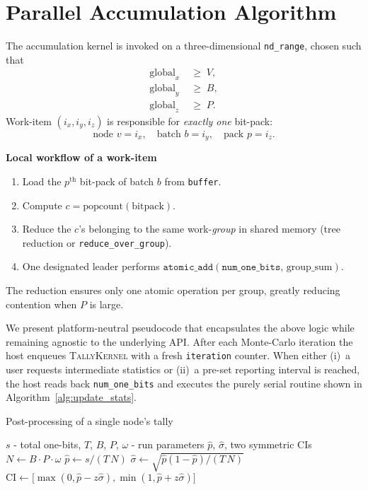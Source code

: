 \section{Parallel Accumulation Algorithm}

The accumulation kernel is invoked on a three-dimensional
\texttt{nd\_range}, chosen such that
\[
  \begin{aligned}
    \text{global}_x &\;\ge\; V,\\
    \text{global}_y &\;\ge\; B,\\
    \text{global}_z &\;\ge\; P.
  \end{aligned}
\]
Work-item \((i_x,i_y,i_z)\) is responsible for \emph{exactly one} bit-pack:
\[
  \text{node  } v=i_x,\quad
  \text{batch } b=i_y,\quad
  \text{pack  } p=i_z.
\]

\vspace{4pt}
\noindent
\textbf{Local workflow of a work-item}
\begin{enumerate}
    \item Load the \(p^{\text{th}}\) bit-pack of batch \(b\) from
          \texttt{buffer}.
    \item Compute \(c=\mathrm{popcount}(\text{bitpack})\).
    \item Reduce the \(c\)'s belonging to the same work-\emph{group} in
          shared memory (tree reduction or \texttt{reduce\_over\_group}).
    \item One designated leader performs
          \(\texttt{atomic\_add}(\texttt{num\_one\_bits},\,\text{group\_sum})\).
\end{enumerate}

The reduction ensures only one atomic operation per group, greatly reducing
contention when \(P\) is large.

We present platform-neutral pseudocode that encapsulates the above logic while remaining agnostic to the underlying API. After each Monte-Carlo iteration the host enqueues \textsc{TallyKernel} with a
fresh \texttt{iteration} counter.  When either (i)~a user requests
intermediate statistics or (ii)~a pre-set reporting interval is reached,
the host reads back \texttt{num\_one\_bits} and executes the purely
serial routine shown in Algorithm~\ref{alg:update_stats}.

\begin{algorithm}[H]
\caption{Post-processing of a single node's tally}
\label{alg:update_stats}
\begin{algorithmic}[1]
  \Require
    \(s\) - total one-bits,
    \(T\), \(B\), \(P\), \(\omega\) - run parameters
  \Ensure
    \(\widehat{p}\), \(\widehat{\sigma}\), two symmetric CIs
  \State $N\gets B\cdot P\cdot\omega$
  \State $\widehat{p}\gets s / (T\,N)$
  \State $\widehat{\sigma}\gets
          \sqrt{\widehat{p}(1-\widehat{p})/(T\,N)}$
      \State $\text{CI}\gets
        \bigl[\max(0,\widehat{p}-z\widehat{\sigma}),
              \min(1,\widehat{p}+z\widehat{\sigma})\bigr]$
  \EndFor
\end{algorithmic}
\end{algorithm}

